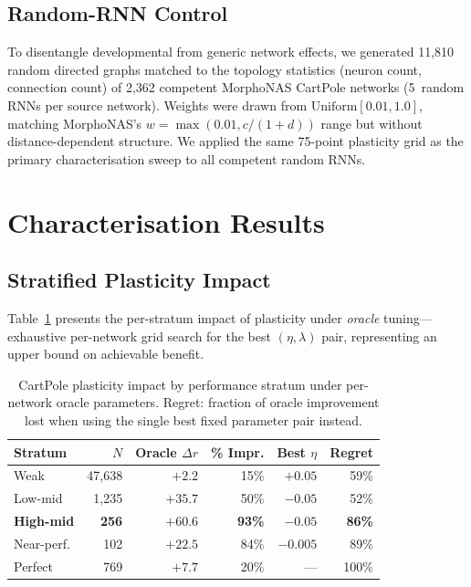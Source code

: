 \documentclass[sigconf,nonacm]{acmart}
\begin{document}
\subsection{Random-RNN Control}
\label{sec:random_rnn_design}

To disentangle developmental from generic network effects, we generated 11{,}810 random directed graphs matched to the topology statistics (neuron count, connection count) of 2{,}362 competent MorphoNAS CartPole networks (5~random RNNs per source network). Weights were drawn from $\text{Uniform}[0.01, 1.0]$, matching MorphoNAS's $w = \max(0.01, c/(1{+}d))$ range but without distance-dependent structure. We applied the same 75-point plasticity grid as the primary characterisation sweep to all competent random RNNs.

\section{Characterisation Results}
\label{sec:results}

\subsection{Stratified Plasticity Impact}
\label{sec:stratified}

Table~\ref{tab:stratified} presents the per-stratum impact of plasticity under \emph{oracle} tuning---exhaustive per-network grid search for the best $(\eta, \lambda)$ pair, representing an upper bound on achievable benefit.

\begin{table}[t]
\caption{CartPole plasticity impact by performance stratum under per-network oracle parameters. Regret: fraction of oracle improvement lost when using the single best fixed parameter pair instead.}
\label{tab:stratified}
\small
\begin{tabular}{@{}lrrrrr@{}}
\toprule
Stratum & $N$ & Oracle $\Delta r$ & \% Impr. & Best $\eta$ & Regret \\
\midrule
Weak       & 47{,}638 & $+2.2$   & 15\% & $+0.05$ & 59\%  \\
Low-mid    & 1{,}235  & $+35.7$  & 50\% & $-0.05$ & 52\%  \\
\textbf{High-mid} & \textbf{256} & $\mathbf{+60.6}$ & \textbf{93\%} & $\mathbf{-0.05}$ & \textbf{86\%} \\
Near-perf. & 102      & $+22.5$  & 84\% & $-0.005$ & 89\% \\
Perfect    & 769      & $+7.7$   & 20\% & ---     & 100\% \\
\bottomrule
\end{tabular}
\end{table}
\end{document}
